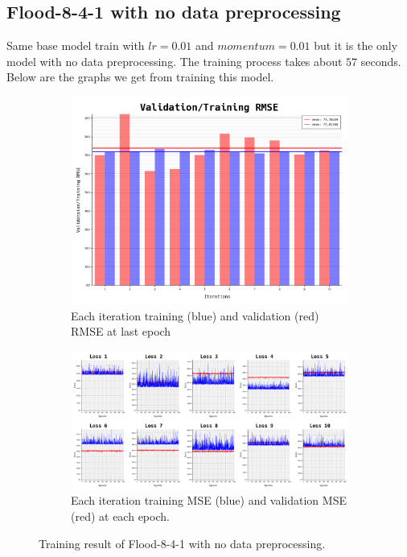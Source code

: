 \documentclass{article}
\begin{document}
\newpage
\subsection*{Flood-8-4-1 with no data preprocessing}
Same base model train with $lr = 0.01$ and $momentum = 0.01$ but 
it is the only model with no data preprocessing. The training process takes about $57$ seconds.
Below are the graphs we get from training this model. 
\begin{figure}[ht]
	\begin{subfigure}{\textwidth}
		\centering
		\includegraphics[scale=0.3]{flood-8-4-1_4/cv_l}
		\caption{Each iteration training (blue) and validation (red) RMSE at last epoch}
		\label{fig:5a}
	\end{subfigure}
	\begin{subfigure}{\textwidth}
		\includegraphics[width=\textwidth]{flood-8-4-1_4/loss}
		\caption{Each iteration training MSE (blue) and validation MSE (red) at each epoch.}
		\label{fig:5b}
	\end{subfigure}
	\caption{Training result of Flood-8-4-1 with no data preprocessing.}
	\label{fig:5}
\end{figure}
\FloatBarrier
\end{document}
